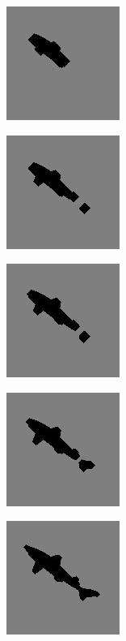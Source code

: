 \documentclass{article}
\begin{document}
\begin{figure}[h]
\caption{}
\centering
\includegraphics{images/rebuilt_image7.jpg}
\end{figure}

\begin{figure}[h]
\caption{}
\centering
\includegraphics{images/rebuilt_image6.jpg}
\end{figure}

\begin{figure}[h]
\caption{}
\centering
\includegraphics{images/rebuilt_image5.jpg}
\end{figure}

\begin{figure}[h]
\caption{}
\centering
\includegraphics{images/rebuilt_image4.jpg}
\end{figure}

\begin{figure}[h]
\caption{}
\centering
\includegraphics{images/rebuilt_image3.jpg}
\end{figure}
\end{document}
